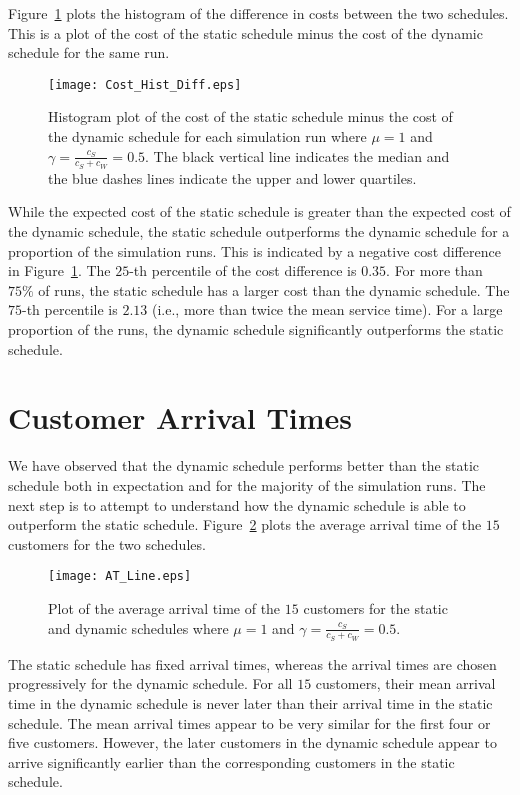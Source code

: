 Figure~\ref{fig:Diff_Cost} plots the histogram of the difference in costs between the two schedules. This is a plot of the cost of the static schedule minus the cost of the dynamic schedule for the same run.
\begin{figure}[htb]
	\centering
	\texttt{[image: Cost\_Hist\_Diff.eps]}
	\caption{Histogram plot of the cost of the static schedule minus the cost of the dynamic schedule for each simulation run where $\mu = 1$ and $\gamma = \frac{c_{S}}{c_{S} + c_{W}} = 0.5$. The black vertical line indicates the median and the blue dashes lines indicate the upper and lower quartiles.}
	\label{fig:Diff_Cost}
\end{figure}

While the expected cost of the static schedule is greater than the expected cost of the dynamic schedule, the static schedule outperforms the dynamic schedule for a proportion of the simulation runs. This is indicated by a negative cost difference in Figure~\ref{fig:Diff_Cost}. The $25$-th percentile of the cost difference is $0.35$. For more than $75 \%$ of runs, the static schedule has a larger cost than the dynamic schedule. The $75$-th percentile is $2.13$ (i.e., more than twice the mean service time). For a large proportion of the runs, the dynamic schedule significantly outperforms the static schedule.

\section{Customer Arrival Times}
We have observed that the dynamic schedule performs better than the static schedule both in expectation and for the majority of the simulation runs. The next step is to attempt to understand how the dynamic schedule is able to outperform the static schedule. Figure~\ref{fig:Avg_Arrival} plots the average arrival time of the $15$ customers for the two schedules.
\begin{figure}[htb]
	\centering
	\texttt{[image: AT\_Line.eps]}
	\caption{Plot of the average arrival time of the $15$ customers for the static and dynamic schedules where $\mu = 1$ and $\gamma = \frac{c_{S}}{c_{S} + c_{W}} = 0.5$.}
	\label{fig:Avg_Arrival}
\end{figure}

The static schedule has fixed arrival times, whereas the arrival times are chosen progressively for the dynamic schedule. For all $15$ customers, their mean arrival time in the dynamic schedule is never later than their arrival time in the static schedule. The mean arrival times appear to be very similar for the first four or five customers. However, the later customers in the dynamic schedule appear to arrive significantly earlier than the corresponding customers in the static schedule.

